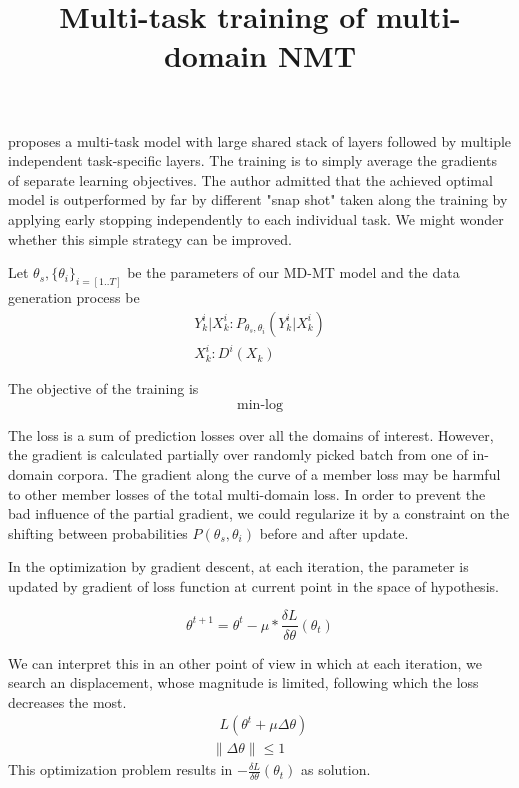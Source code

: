 \documentclass[12pt,times,a4paper,twoside]{article}
\title{Multi-task training of multi-domain NMT}
\author{}
\date{}
\newcommand{\fyDone}[1]{\done[FY]\Todo[FY:]{\textcolor{orange}{#1}}}
\theoremstyle{definition}
\DeclareMathOperator*{\argmax}{argmax}
\begin{document}
\maketitle
\begin{center}
{\LARGE \bf}\fyDone{Make a proper title}
\end{center}
\cite{Caruana97multitask} proposes a multi-task model with large shared stack of layers followed by multiple independent task-specific layers. The training is to simply average the gradients of separate learning objectives. The author admitted that the achieved optimal model is outperformed by far by different "snap shot" taken along the training by applying early stopping independently to each individual task. We might wonder whether this simple strategy can be improved.

Let $\theta_s, \{\theta_i\}_{i=[1..T]}$ be the parameters of our MD-MT model and the data generation process be 
\begin{align*}
Y_k^i | X_k^i : P_{\theta_s, \theta_i}(Y_k^i | X_k^i) \\
X_k^i : D^i(X_k)
\end{align*}

The objective of the training is $$\displaystyle{\mathop{\min \sum_{i=1}^{T}\sum_{X_k^i, Y_k^i} -log(P_{\theta_s,\theta_i}(Y_k^i | X_k^i))}}$$

The loss is a sum of prediction losses over all the domains of interest. However, the gradient is calculated partially over randomly picked batch from one of in-domain corpora. The gradient along the curve of a member loss may be harmful to other member losses of the total multi-domain loss. In order to prevent the bad influence of the partial gradient, we could regularize it by a constraint on the shifting between probabilities $P(\theta_s, \theta_i)$ before and after update. 

In the optimization by gradient descent, at each iteration, the parameter is updated by gradient of loss function at current point in the space of hypothesis.

\begin{equation}
\theta^{t+1} = \theta^t - \mu * \frac{\delta L}{\delta \theta}(\theta_t)
\end{equation}

We can interpret this in an other point of view in which at each iteration, we search an displacement, whose magnitude is limited, following which the loss decreases the most.
\begin{align}\label{eq}
	\displaystyle{\mathop{\argmax_{\Delta \theta}} L(\theta^t + \mu \Delta \theta)} \\
	\parallel \Delta \theta \parallel \leq 1  \nonumber
\end{align}
This optimization problem results in $-\frac{\delta L}{\delta \theta}(\theta_t)$ as solution. 
\end{document}
